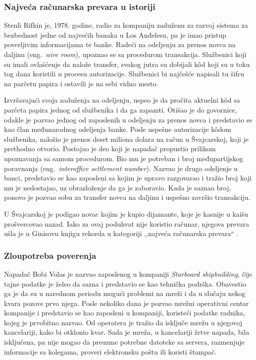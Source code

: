 \documentclass[a4paper]{article}
\begin{document}
\subsubsection{Najveća računarska prevara u istoriji}
\label{hack_za_ginisa}

Stenli Rifkin je, 1978. godine, radio za kompaniju 
zaduženu za razvoj sistema za bezbednost jedne od 
najvećih banaka u Los Anđelesu, pa je imao pristup 
poverljivim informacijama te banke. Radeći na 
odeljenju za prenos novca na daljinu (eng.~{\em wire 
room}), upoznao se sa procedurom transakcija. 
Službenici koji su imali ovlašćenje da nalože 
transfer, svakog jutra su dobijali kôd koji su u toku 
tog dana koristili u procesu autorizacije. Službenici 
bi najčešće napisali tu šifru na parčetu papira i 
ostavili je na sebi vidno mesto. 

Izvršavajući svoja zaduženja na odeljenju, uspeo je da pročita aktuelni kôd sa parčeta papira jednog od službenika i da ga zapamti. Otišao je do govornice, odakle je pozvao jednog od zaposlenih u odeljenju za prenos novca i predstavio se kao član međunarodnog odeljenja banke.
Posle uspešne autorizacije kôdom službenika, naložio je prenos deset miliona dolara na račun u Švajcarskoj, koji je prethodno otvorio. Postojao je deo koji je napadač propustio prilikom upoznavanja sa samom procedurom. Bio mu je potreban i broj međupartijskog poravnanja (eng.~{\em interoffice settlement number}). Nazvao je drugo odeljenje u banci, predstavio se kao zaposleni sa kojim je upravo razgovarao i tražio broj koji mu je nedostajao, uz obrazloženje da ga je zaboravio. Kada je saznao broj, ponovo je pozvao sobu za transfer novca na daljinu i uspešno završio transakciju. 

U Švajcarskoj je podigao novac kojim je kupio dijamante, koje je kasnije u kaišu prošvercovao nazad. Iako za ovaj poduhvat nije koristio računar, njegova prevara ušla je u Ginisovu knjigu rekorda u kategoriji ,,najveća računarska prevara`` \cite{deception}.

\subsubsection{Zloupotreba poverenja}
\label{pomoc_neprijatelja}

Napadač Bobi Volas je nazvao zaposlenog u kompaniji 
\textit{Starboard shipbuilding}, čije tajne podatke je želeo da sazna i predstavio se kao tehnička podrška. Obavestio ga je da su u narednom periodu mogući problemi na mreži i da u slučaju nekog kvara pozove prvo njega. Posle nekoliko dana je pozvao mrežni operativni centar kompanije i predstavio se kao zaposleni u kompaniji, koristeći podatke radnika, kojeg je prvobitno nazvao. Od operatera je tražio da isključe mrežu u njegovoj kancelariji, kako bi otklonio kvar. Sada je mreža, u kancelariji žrtve napada, bila isključena, pa nije mogao da preuzme potrebne datoteke sa servera, razmenjuje informacije sa kolegama, proveri elektronsku poštu ili koristi štampač.
\end{document}
